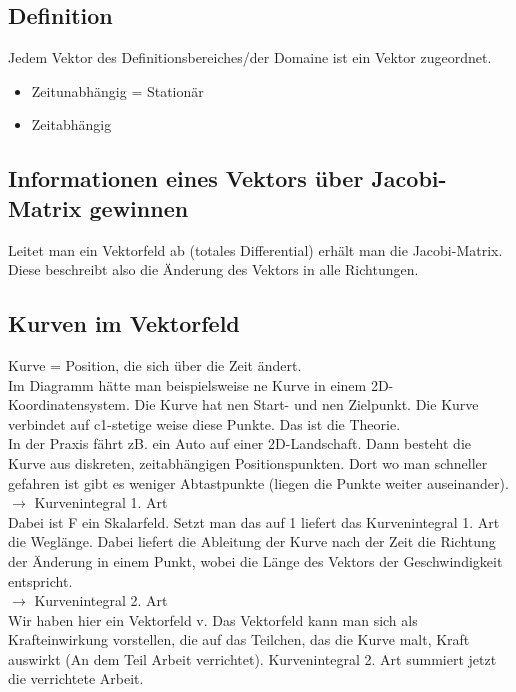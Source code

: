 \documentclass{article}
\begin{document}
\subsection{Definition}
Jedem Vektor des Definitionsbereiches/der Domaine ist ein Vektor zugeordnet.

\begin{itemize}[noitemsep]
	\item Zeitunabhängig = Stationär	
	\item Zeitabhängig
\end{itemize}

\subsection{Informationen eines Vektors über Jacobi-Matrix gewinnen}
Leitet man ein Vektorfeld ab (totales Differential) erhält man die Jacobi-Matrix. Diese beschreibt also die Änderung des Vektors in alle Richtungen.\\

\subsection{Kurven im Vektorfeld}
Kurve = Position, die sich über die Zeit ändert.\\
Im Diagramm hätte man beispielsweise ne Kurve in einem 2D-Koordinatensystem. Die Kurve hat nen Start- und nen Zielpunkt. Die Kurve verbindet auf c1-stetige weise diese Punkte. Das ist die Theorie.\\

\noindent In der Praxis fährt zB. ein Auto auf einer 2D-Landschaft. Dann besteht die Kurve aus diskreten, zeitabhängigen Positionspunkten. Dort wo man schneller gefahren ist gibt es weniger Abtastpunkte (liegen die Punkte weiter auseinander). \\

\noindent  $\rightarrow$ Kurvenintegral 1. Art\\ 
Dabei ist F ein Skalarfeld. Setzt man das auf 1 liefert das Kurvenintegral 1. Art die Weglänge. 
Dabei liefert die Ableitung der Kurve nach der Zeit die Richtung der Änderung in einem Punkt, wobei die Länge des Vektors der Geschwindigkeit entspricht.\\

\noindent  $\rightarrow$ Kurvenintegral 2. Art\\ 
Wir haben hier ein Vektorfeld v. Das Vektorfeld kann man sich als Krafteinwirkung vorstellen, die auf das Teilchen, das die Kurve malt, Kraft auswirkt (An dem Teil Arbeit verrichtet). Kurvenintegral 2. Art summiert jetzt die verrichtete Arbeit.\\
\end{document}
